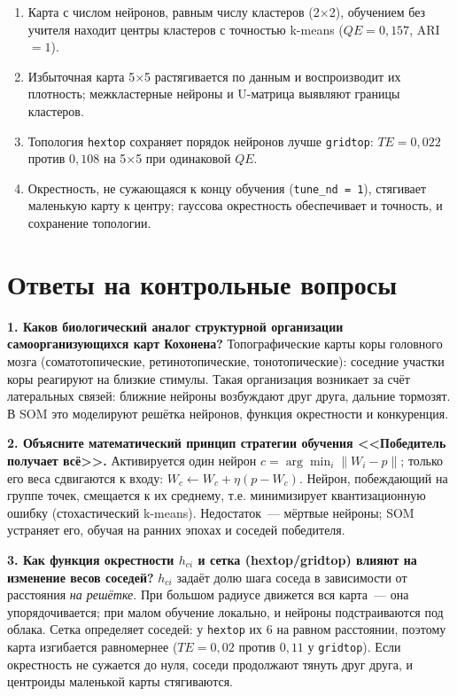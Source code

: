 \documentclass[14pt,a4paper]{extarticle}
\begin{document}
\begin{enumerate}
\item Карта с числом нейронов, равным числу кластеров (2$\times$2), обучением без учителя находит центры кластеров с точностью k-means ($QE = 0{,}157$, ARI~$= 1$).
\item Избыточная карта 5$\times$5 растягивается по данным и воспроизводит их плотность; межкластерные нейроны и U-матрица выявляют границы кластеров.
\item Топология \texttt{hextop} сохраняет порядок нейронов лучше \texttt{gridtop}: $TE = 0{,}022$ против $0{,}108$ на 5$\times$5 при одинаковой $QE$.
\item Окрестность, не сужающаяся к концу обучения (\texttt{tune\_nd = 1}), стягивает маленькую карту к центру; гауссова окрестность обеспечивает и точность, и сохранение топологии.
\end{enumerate}

\section{Ответы на контрольные вопросы}

\textbf{1. Каков биологический аналог структурной организации самоорганизующихся карт Кохонена?} Топографические карты коры головного мозга (соматотопические, ретинотопические, тонотопические): соседние участки коры реагируют на близкие стимулы. Такая организация возникает за счёт латеральных связей: ближние нейроны возбуждают друг друга, дальние тормозят. В SOM это моделируют решётка нейронов, функция окрестности и конкуренция.

\textbf{2. Объясните математический принцип стратегии обучения <<Победитель получает всё>>.} Активируется один нейрон $c = \arg\min_i \lVert W_i - p\rVert$; только его веса сдвигаются к входу: $W_c \leftarrow W_c + \eta(p - W_c)$. Нейрон, побеждающий на группе точек, смещается к их среднему, т.е. минимизирует квантизационную ошибку (стохастический k-means). Недостаток~--- мёртвые нейроны; SOM устраняет его, обучая на ранних эпохах и соседей победителя.

\textbf{3. Как функция окрестности $h_{ci}$ и сетка (hextop/gridtop) влияют на изменение весов соседей?} $h_{ci}$ задаёт долю шага соседа в зависимости от расстояния \emph{на решётке}. При большом радиусе движется вся карта~--- она упорядочивается; при малом обучение локально, и нейроны подстраиваются под облака. Сетка определяет соседей: у \texttt{hextop} их 6 на равном расстоянии, поэтому карта изгибается равномернее ($TE = 0{,}02$ против $0{,}11$ у \texttt{gridtop}). Если окрестность не сужается до нуля, соседи продолжают тянуть друг друга, и центроиды маленькой карты стягиваются.
\end{document}
